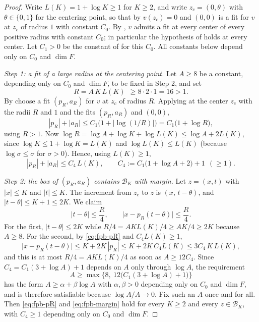 \begin{proof}
Write $L(K)=1+\log K\ge1$ for $K\ge2$, and write $z_c=(0,\theta)$ with
$\theta\in\{0,1\}$ for the centering point, so that by 
$v(z_c)=0$ and $(0,0)$ is a fit for $v$ at $z_c$ of radius $1$ with constant
$C_0$. By , $v$ admits a fit at every center of every
positive radius with constant $C_0$; in particular the hypothesis of
 holds at every center. Let $C_1>0$ be the
constant of  for this $C_0$. All constants
below depend only on $C_0$ and $\dim F$.

\emph{Step 1: a fit of a large radius at the centering point.}
Let $A\ge8$ be a constant, depending only on $C_0$ and $\dim F$, to be fixed in
Step 2, and set
\[
  R=A\,K\,L(K)\ \ \ge8\cdot2\cdot1=16>1 .
\]
By  choose a fit $(p_R,a_R)$ for $v$ at $z_c$ of radius $R$.
Applying  at the center $z_c$ with the radii
$R$ and $1$ and the fits $(p_R,a_R)$ and $(0,0)$,
\[
  |p_R|+|a_R|\le C_1\bigl(1+|\log(1/R)|\bigr)=C_1\bigl(1+\log R\bigr),
\]
using $R>1$. Now $\log R=\log A+\log K+\log L(K)\le\log A+2L(K)$, since
$\log K\le1+\log K=L(K)$ and $\log L(K)\le L(K)$ (because $\log\sigma\le\sigma$
for $\sigma>0$). Hence, using $L(K)\ge1$,
\begin{equation}\label{eq:fpb-pR}
  |p_R|+|a_R|\le C_4\,L(K),
  \qquad C_4:=C_1\bigl(1+\log A+2\bigr)+1\ \ (\ge1).
\end{equation}

\emph{Step 2: the box of $(p_R,a_R)$ contains $\mathcal B_K$ with margin.}
Let $z=(x,t)$ with $|x|\le K$ and $|t|\le K$. The increment from $z_c$ to $z$ is
$(x,\,t-\theta)$, and $|t-\theta|\le K+1\le2K$. We claim
\begin{equation}\label{eq:fpb-margin}
  |t-\theta|\le\frac R4,
  \qquad \bigl|x-p_R(t-\theta)\bigr|\le\frac R4 .
\end{equation}
For the first, $|t-\theta|\le2K$ while $R/4=AKL(K)/4\ge AK/4\ge2K$ because
$A\ge8$. For the second, by \eqref{eq:fpb-pR} and $C_4L(K)\ge1$,
\[
  \bigl|x-p_R(t-\theta)\bigr|\le K+2K\,|p_R|\le K+2K\,C_4L(K)\le3C_4\,K\,L(K),
\]
and this is at most $R/4=AKL(K)/4$ as soon as $A\ge12C_4$. Since
$C_4=C_1(3+\log A)+1$ depends on $A$ only through $\log A$, the requirement
\[
  A\ge\max\bigl\{8,\ 12\bigl(C_1(3+\log A)+1\bigr)\bigr\}
\]
has the form $A\ge\alpha+\beta\log A$ with $\alpha,\beta>0$ depending only on
$C_0$ and $\dim F$, and is therefore satisfiable because $\log A/A\to0$. Fix
such an $A$ once and for all. Then \eqref{eq:fpb-pR} and
\eqref{eq:fpb-margin} hold for every $K\ge2$ and every $z\in\mathcal B_K$, with
$C_4\ge1$ depending only on $C_0$ and $\dim F$.


\end{proof}
